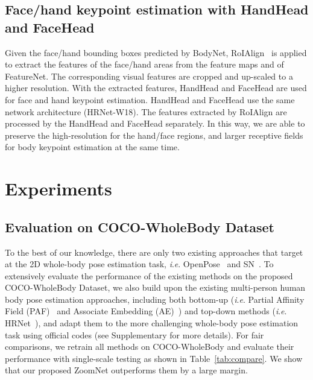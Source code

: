 \documentclass[runningheads]{llncs}
\newcommand{\ie}{\textit{i}.\textit{e}. }
\begin{document}
	\subsection{Face/hand keypoint estimation with HandHead and FaceHead}
	Given the face/hand bounding boxes predicted by BodyNet, RoIAlign~\cite{he2017mask} is applied to extract the features of the face/hand areas from the feature maps  and  of FeatureNet. The corresponding visual features are cropped and up-scaled to a higher resolution. With the extracted features, HandHead and FaceHead are used for face and hand keypoint estimation. HandHead and FaceHead use the same network architecture (HRNet-W18). The features extracted by RoIAlign are processed by the HandHead and FaceHead separately. In this way, we are able to preserve the high-resolution for the hand/face regions, and larger receptive fields for body keypoint estimation at the same time. 
	
	\section{Experiments}
	
	\subsection{Evaluation on COCO-WholeBody Dataset}
	To the best of our knowledge, there are only two existing approaches that target at the 2D whole-body pose estimation task, \ie OpenPose~\cite{cao2018openpose} and SN~\cite{hidalgo2019single}. To extensively evaluate the performance of the existing methods on the proposed COCO-WholeBody Dataset, we also build upon the existing multi-person human body pose estimation approaches, including both bottom-up (\ie Partial Affinity Field (PAF)~\cite{cao2017realtime} and Associate Embedding (AE)~\cite{newell2017associative}) and top-down methods (\ie HRNet~\cite{sun2019deep}), and adapt them to the more challenging whole-body pose estimation task using official codes (see Supplementary for more details). For fair comparisons, we retrain all methods on COCO-WholeBody and evaluate their performance with single-scale testing as shown in Table~\ref{tab:compare}. We show that our proposed ZoomNet outperforms them by a large margin. 
	
\end{document}
